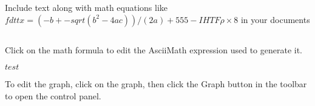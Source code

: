 \par Include text along with math equations like $fdtt x=(-b+-sqrt(b^2-4ac))/(2a)+555-IHTF\rho \times 8$ in your documents\par \par $ $\par \par Click on the math formula to edit the AsciiMath expression used to generate it.\par \par $test$\par \par To edit the graph, click on the graph, then click the Graph button in the toolbar to open the control panel.\par \par \par 